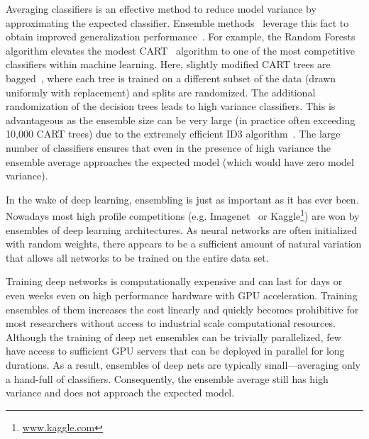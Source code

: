 Averaging classifiers is an effective method to reduce model variance by approximating the expected classifier. Ensemble methods~\citep{breiman2001random,caruana2004ensemble,hansen1990neural,krogh1995neural,zhou2002ensembling} leverage this fact to obtain improved generalization performance~\cite{koren2009bellkor}. 
For example, the Random Forests~\cite{breiman2001random}  algorithm elevates the modest CART~\cite{breiman1984classification} algorithm to one of the most competitive classifiers within machine learning. 
Here, slightly modified CART trees are bagged~\cite{breiman2001random}, where each tree is trained on a different subset of the data (drawn uniformly with replacement) and splits are randomized. The additional randomization of the decision trees leads to high variance classifiers. This is advantageous as the ensemble size can be very large (in practice often exceeding 10,000 CART trees) due to the extremely efficient ID3 algorithm~\cite{quinlan1986induction}. The large number of classifiers ensures that even in the presence of high variance the ensemble average approaches the expected model (which would have zero model variance).  

In the wake of deep learning, ensembling is just as important as it has ever been. Nowadays most high profile competitions (e.g. Imagenet~\cite{deng2009imagenet} or Kaggle\footnote{\url{www.kaggle.com}}) are won by ensembles of deep learning architectures. As neural networks are often initialized with random weights, there appears to be a sufficient amount of natural variation that allows all networks to be trained on the entire data set. 

Training deep networks is computationally expensive and can last for days or even weeks even on high performance hardware with GPU acceleration. Training ensembles of them increases the cost linearly and quickly becomes prohibitive for most researchers without access to industrial scale computational resources. Although the training of deep net ensembles can be trivially parallelized, few have access to sufficient GPU servers that can be deployed in parallel for long durations. As a result, ensembles of deep nets are typically small---averaging only a hand-full of classifiers. Consequently, the ensemble average still has high variance and does not approach the expected model. 

